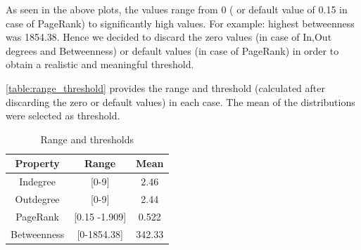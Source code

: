 As seen in the above plots, the values range from 0 ( or default value of 0.15 in case of PageRank) to significantly high values. For example: highest betweenness was 1854.38. Hence we decided to discard the zero values (in case of In,Out degrees and Betweenness) or default values (in case of PageRank) in order to obtain a realistic and meaningful threshold.

\autoref{table:range_threshold}  provides the range and threshold (calculated after discarding the zero or default values) in each case. The mean of the distributions were selected as threshold.  

\begin{table}[ht]
\caption{Range and thresholds}
\centering 
\begin{tabular}{c c c}
\hline
Property & Range & Mean \\[0.5ex]
\hline
Indegree & [0-9] & 2.46 \\
Outdegree & [0-9] & 2.44 \\
PageRank & [0.15 -1.909] & 0.522 \\
Betweenness & [0-1854.38] & 342.33 \\ [1ex]
\hline
\end{tabular}
\label{table:range_threshold}
\end{table}

